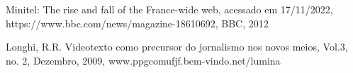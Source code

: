 \documentclass[
12pt,		%
openright,	%
twoside,  %
a4paper,			%
chapter=TITLE,		%
english,			%
french,				%
spanish,			%
brazil				%
]{USPSC-classe/USPSC}
\begin{document}
\begin{flushleft}
\begin{flushleft}
\begin{flushleft}
\begin{flushleft}
\begin{flushleft}
\begin{flushleft}
\begin{flushleft}
\begin{flushleft}
\begin{flushleft}
[BBC, 2012] Minitel: The rise and fall of the France-wide web, acessado em 17/11/2022, https://www.bbc.com/news/magazine-18610692, BBC, 2012
\end{flushleft}


\end{flushleft}


\end{flushleft}


\end{flushleft}


\end{flushleft}


\end{flushleft}


\end{flushleft}


\end{flushleft}


\end{flushleft}


\begin{flushleft}
\begin{flushleft}
\begin{flushleft}
\begin{flushleft}
\begin{flushleft}
\begin{flushleft}
\begin{flushleft}
\begin{flushleft}
\begin{flushleft}
[Longhi, 2009] Longhi, R.R. Videotexto como precursor do jornalismo nos novos meios, Vol.3, no. 2, Dezembro, 2009, www.ppgcomufjf.bem-vindo.net/lumina
\end{flushleft}


\end{flushleft}


\end{flushleft}


\end{flushleft}


\end{flushleft}


\end{flushleft}


\end{flushleft}


\end{flushleft}


\end{flushleft}
\end{document}
